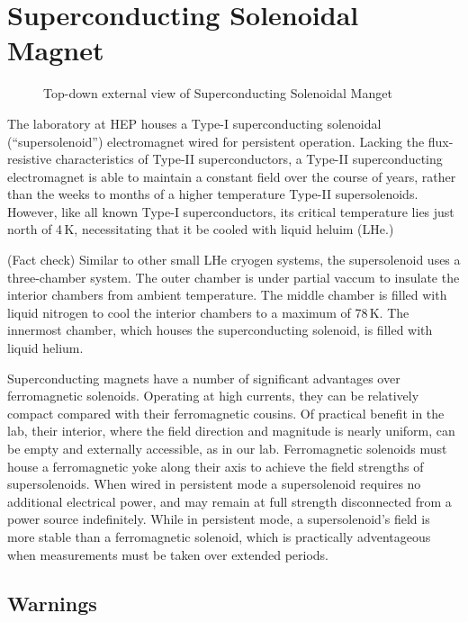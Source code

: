 
\chapter{Superconducting Solenoidal Magnet}
\label{chap:eq_magnet}

\begin{figure}[htbp]
  \centering
  
  \caption{Top-down external view of Superconducting Solenoidal Manget}
  \label{fig:eq_magnet:topdown}
\end{figure}

The laboratory at HEP houses a Type-I superconducting solenoidal (``supersolenoid'') electromagnet wired for persistent operation.  Lacking the flux-resistive characteristics of Type-II superconductors, a Type-II superconducting electromagnet is able to maintain a constant field over the course of years, rather than the weeks to months of a higher temperature Type-II supersolenoids.  However, like all known Type-I superconductors, its critical temperature lies just north of 4\,K, necessitating that it be cooled with liquid heluim (LHe.)

\FIXME{} (Fact check) Similar to other small LHe cryogen systems, the supersolenoid uses a three-chamber system.  The outer chamber is under partial vaccum to insulate the interior chambers from ambient temperature.  The middle chamber is filled with liquid nitrogen to cool the interior chambers to a maximum of 78\,K.  The innermost chamber, which houses the superconducting solenoid, is filled with liquid helium.

Superconducting magnets have a number of significant advantages over ferromagnetic solenoids.  Operating at high currents, they can be relatively compact compared with their ferromagnetic cousins.  Of practical benefit in the lab, their interior, where the field direction and magnitude is nearly uniform, can be empty and externally accessible, as in our lab.  Ferromagnetic solenoids must house a ferromagnetic yoke along their axis to achieve the field strengths of supersolenoids.  When wired in persistent mode a supersolenoid requires no additional electrical power, and may remain at full strength disconnected from a power source indefinitely.  While in persistent mode, a supersolenoid's field is more stable than a ferromagnetic solenoid, which is practically adventageous when measurements must be taken over extended periods.


\section{Warnings}
\label{sec:eq_magnet}


